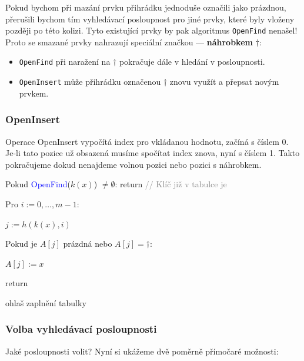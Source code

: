 \begin{remark}
Pokud bychom při mazání prvku přihrádku jednoduše označili jako prázdnou, přerušili bychom tím vyhledávací posloupnost pro jiné prvky, které byly vloženy později po této kolizi. Tyto existující prvky by pak algoritmus \texttt{OpenFind} nenašel!
Proto se smazané prvky nahrazují speciální značkou — \textbf{náhrobkem} $\dagger$:
\begin{itemize}[itemsep=-0.15em]
    \item \texttt{OpenFind} při naražení na $\dagger$ pokračuje dále v hledání v posloupnosti.
    \item \texttt{OpenInsert} může přihrádku označenou $\dagger$ znovu využít a přepsat novým prvkem.
\end{itemize}
\end{remark}

\bigskip

\subsubsection{OpenInsert}

Operace OpenInsert vypočítá index pro vkládanou hodnotu, začíná s číslem 0. Je-li tato pozice už obsazená musíme spočítat index znova, nyní s číslem 1. Takto pokračujeme dokud nenajdeme volnou pozici nebo pozici s náhrobkem.

\medskip

\begin{pseudocode}
\item Pokud \textcolor{blue}{OpenFind}($k(x)$) $\neq \emptyset$: return \textcolor{gray}{// Klíč již v tabulce je}
\item Pro $i := 0, \dots, m-1$:
\item \tab $j := h(k(x), i)$
\item \tab Pokud je $A[j]$ prázdná nebo $A[j] = \dagger$:
\item \tab \tab $A[j] := x$
\item \tab \tab return
\item ohlaš zaplnění tabulky
\end{pseudocode}

\bigskip

\subsubsection{Volba vyhledávací posloupnosti}

\noindent Jaké posloupnosti volit? Nyní si ukážeme dvě poměrně přímočaré možnosti:

